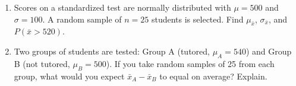 \documentclass[10pt]{article}
\begin{document}
\namedateperiod

\vspace{0.15in}

\begin{enumerate}

  \item Scores on a standardized test are normally distributed with $\mu = 500$ and
        $\sigma = 100$. A random sample of $n = 25$ students is selected. Find
        $\mu_{\bar{x}}$, $\sigma_{\bar{x}}$, and $P(\bar{x} > 520)$.
        \vspace{1.2in}

  \item Two groups of students are tested: Group A (tutored, $\mu_A = 540$) and Group B
        (not tutored, $\mu_B = 500$). If you take random samples of 25 from each group,
        what would you expect $\bar{x}_A - \bar{x}_B$ to equal on average? Explain.

\end{enumerate}
\end{document}
